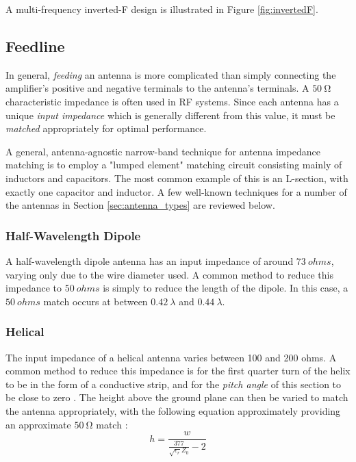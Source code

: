 A multi-frequency inverted-F design is illustrated in Figure \ref{fig:invertedF}.

\subsection{Feedline}
In general, \textit{feeding} an antenna is more complicated than simply connecting the amplifier's positive and negative terminals to the antenna's terminals. A $\SI{50}{\ohm}$ characteristic impedance is often used in RF systems. Since each antenna has a unique \textit{input impedance} which is generally different from this value, it must be \textit{matched} appropriately for optimal performance.

A general, antenna-agnostic narrow-band technique for antenna impedance matching is to employ a "lumped element" matching circuit consisting mainly of inductors and capacitors. The most common example of this is an L-section, with exactly one capacitor and inductor. A few well-known techniques for a number of the antennas in Section \ref{sec:antenna_types} are reviewed below.

\subsubsection{Half-Wavelength Dipole}
A half-wavelength dipole antenna has an input impedance of around $\SI{73}{ohms}$, varying only due to the wire diameter used. A common method to reduce this impedance to $\SI{50}{ohms}$ is simply to reduce the length of the dipole. In this case, a $\SI{50}{ohms}$ match occurs at between $\SI{0.42}{\lambda}$ and $\SI{0.44}{\lambda}$. \cite{textbook-antennaTheoryAnalysisDesign}

\subsubsection{Helical}\label{sec:helical_matching}
The input impedance of a helical antenna varies between 100 and 200 ohms. A common method to reduce this impedance is for the first quarter turn of the helix to be in the form of a conductive strip, and for the \textit{pitch angle} of this section to be close to zero \cite{textbook-antennaTheoryAnalysisDesign}. The height above the ground plane can then be varied to match the antenna appropriately, with the following equation approximately providing an approximate $\SI{50}{\ohm}$ match \cite{textbook-antennaTheoryAnalysisDesign}:
$$h = \frac{w}{\frac{377}{\sqrt{\epsilon_r} Z_0} - 2}$$

